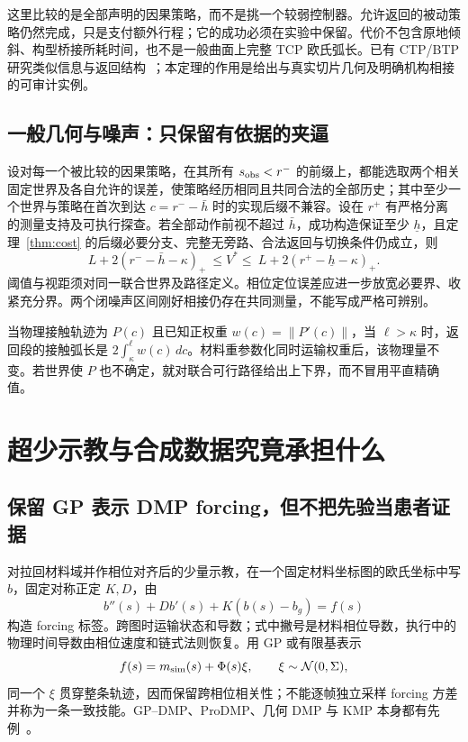 \documentclass[11pt,a4paper]{article}
\theoremstyle{cn}
\newcommand{\norm}[1]{\left\lVert #1\right\rVert}
\newcommand{\pos}[1]{\left(#1\right)_+}
\begin{document}
这里比较的是全部声明的因果策略，而不是挑一个较弱控制器。允许返回的被动策略仍然完成，只是支付额外行程；它的成功必须在实验中保留。代价不包含原地倾斜、构型桥接所耗时间，也不是一般曲面上完整 TCP 欧氏弧长。已有 CTP/BTP 研究类似信息与返回结构~\cite{ctp,btp}；本定理的作用是给出与真实切片几何及明确机构相接的可审计实例。

\subsection{一般几何与噪声：只保留有依据的夹逼}

设对每一个被比较的因果策略，在其所有 \(s_{\rm obs}<r^-\) 的前缀上，都能选取两个相关固定世界及各自允许的误差，使策略经历相同且共同合法的全部历史；其中至少一个世界与策略在首次到达 \(c=r^--\bar h\) 时的实现后缀不兼容。设在 \(r^+\) 有严格分离的测量支持及可执行探查。若全部动作前视不超过 \(\bar h\)，成功构造保证至少 \(\underline h\)，且定理~\ref{thm:cost} 的后缀必要分支、完整无旁路、合法返回与切换条件仍成立，则
\begin{equation}
L+2\pos{r^- -\bar h-\kappa}
\ \le V^*\le\
L+2\pos{r^+ -\underline h-\kappa}.
\label{eq:bracket}
\end{equation}
阈值与视距须对同一联合世界及路径定义。相位定位误差应进一步放宽必要界、收紧充分界。两个闭噪声区间刚好相接仍存在共同测量，不能写成严格可辨别。

当物理接触轨迹为 \(P(c)\) 且已知正权重
\(w(c)=\norm{P'(c)}\)，当 \(\ell>\kappa\) 时，返回段的接触弧长是
\(2\int_\kappa^\ell w(c)\,dc\)。材料重参数化同时运输权重后，该物理量不变。若世界使 \(P\) 也不确定，就对联合可行路径给出上下界，而不冒用平直精确值。

\section{超少示教与合成数据究竟承担什么}
\label{sec:learning}

\subsection{保留 GP 表示 DMP forcing，但不把先验当患者证据}

对拉回材料域并作相位对齐后的少量示教，在一个固定材料坐标图的欧氏坐标中写 \(b\)，固定对称正定 \(K,D\)，由
\begin{equation}
b''(s)+Db'(s)+K(b(s)-b_g)=f(s)
\label{eq:dmp}
\end{equation}
构造 forcing 标签。跨图时运输状态和导数；式中撇号是材料相位导数，执行中的物理时间导数由相位速度和链式法则恢复。用 GP 或有限基表示
\begin{equation}
f(s)=m_{\rm sim}(s)+\Phi(s)\xi,\qquad \xi\sim\mathcal N(0,\Sigma),
\label{eq:gp}
\end{equation}
同一个 \(\xi\) 贯穿整条轨迹，因而保留跨相位相关性；不能逐帧独立采样 forcing 方差并称为一条一致技能。GP--DMP、ProDMP、几何 DMP 与 KMP 本身都有先例~\cite{gpdmp,prodmp,gdmp,kmp}。
\end{document}
